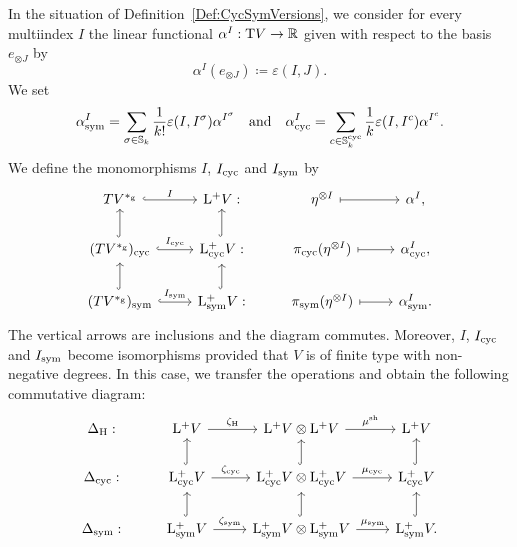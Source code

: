 \documentclass[\MainFolder/Text.tex]{subfiles}
\begin{document}
\begin{Proposition}\label{Prop:HochCycSym}
In the situation of Definition~\ref{Def:CycSymVersions}, we consider for every multiindex $I$ the linear functional $\alpha^I: \mathrm{T} V \rightarrow\mathbb{R}$ given with respect to the basis $e_{\otimes J}$ by 
\[\alpha^I(e_{\otimes J}) \coloneqq \varepsilon(I,J). \]
We set
\begin{equation*}
\alpha^I_{\mathrm{sym}} = \sum_{\sigma\in \mathbb{S}_{k}} \frac{1}{k!} \varepsilon(I,I^\sigma) \alpha^{I^\sigma}\quad\text{and}\quad
\alpha^I_{\mathrm{cyc}} = \sum_{c\in\mathbb{S}^{\mathrm{cyc}}_{k}}\frac{1}{k} \varepsilon(I,I^c)\alpha^{I^c}.
\end{equation*}
We define the monomorphisms $I$, $I_{\mathrm{cyc}}$ and $I_{\mathrm{sym}}$ by
\begin{equation}\label{Eq:IdentDiaCycSym}
\begin{tikzcd}[ampersand replacement=\&]
 TV^{\GD} \arrow[hook]{r}{I} \& \DSpPlus V: \& \eta^{\otimes I} \arrow[mapsto]{r} \&  \alpha^I, \\
 (TV^{\GD})_{\CycMRM} \arrow[hook]{r}{I_{\CycMRM}}\arrow[hook]{u} \& \DSpPlusCyc V: \arrow[hook]{u} \& \CycProj(\eta^{\otimes I}) \arrow[mapsto]{r} \& \alpha_{\CycMRM}^I, \\
(TV^{\GD})_{\SymMRM} \arrow[hook]{r}{I_{\SymMRM}}\arrow[hook]{u} \& \DSpPlusSym V: \arrow[hook]{u} \& \SymProj(\eta^{\otimes I}) \arrow[mapsto]{r} \& \alpha_{\SymMRM}^I.
\end{tikzcd}
\end{equation}
The vertical arrows are inclusions and the diagram commutes. Moreover, $I$, $I_{\mathrm{cyc}}$ and $I_{\mathrm{sym}}$ become isomorphisms provided that $V$ is of finite type with non-negative degrees. 
In this case, we transfer the operations and obtain the following commutative diagram: 
\begin{equation}\label{Eq:ComDiagram}
\begin{tikzcd}
\BVOpHoch: &\DSpPlus V \arrow{r}{\CoProdHoch} & \DSpPlus V \otimes \DSpPlus V \arrow{r}{\ProdSh} & \DSpPlus V \\
\BVOpCyc: &\DSpPlusCyc V \arrow{r}{\CoProdCyc} \arrow[hook]{u} & \DSpPlusCyc V \otimes \DSpPlusCyc V \arrow{r}{\ProdCyc} \arrow[hook]{u} & \DSpPlusCyc V \arrow[hook]{u} \\
\BVOpSym: & \DSpPlusSym V \arrow{r}{\CoProdSym}\arrow[hook]{u} & \DSpPlusSym V \otimes \DSpPlusSym V \arrow{r}{\ProdSym} \arrow[hook]{u} & \DSpPlusSym V. \arrow[hook]{u}

\end{tikzcd}
\end{equation}
\end{Proposition}
\end{document}
